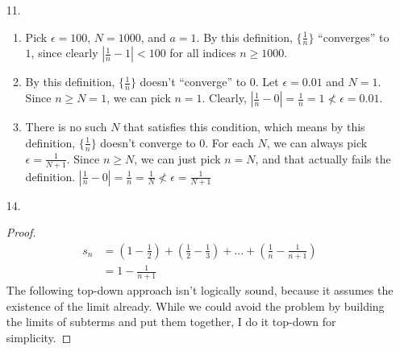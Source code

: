 \documentclass{article}
\begin{document}
\begin{itemize}
\begin{proof}
    The ``only if'' part is very similar. Suppose $\epsilon>0$, then
    we have $|c_n-c|<\epsilon$ when $n \geq N$ for some $N$. We want
    to show that $|(c_n-c)-0| < \epsilon$, and this is clearly true
    since $|(c_n-c)-0|=|c_n-c|<\epsilon$, with the $N$ we just found.
  \end{proof}
\item [11.]
  \begin{enumerate}[label=\alph*.]
  \item Pick $\epsilon=100$, $N=1000$, and $a=1$. By this definition,
    $\{\frac{1}{n}\}$ ``converges'' to $1$, since clearly
    $|\frac{1}{n}-1| < 100$ for all indices $n \geq 1000$.
  \item By this definition, $\{\frac{1}{n}\}$ doesn't ``converge'' to
    $0$. Let $\epsilon = 0.01$ and $N=1$. Since $n \geq N = 1$, we can
    pick $n=1$. Clearly, $|\frac{1}{n} - 0| = \frac{1}{n} = 1 \nless
    \epsilon = 0.01$. 
  \item There is no such $N$ that satisfies this condition, which
    means by this definition, $\{\frac{1}{n}\}$ doesn't converge to
    $0$. For each $N$, we can always pick $\epsilon =
    \frac{1}{N+1}$. Since $n\geq N$, we can just pick $n=N$, and that
    actually fails the definition. $|\frac{1}{n}-0| = \frac{1}{n} =
    \frac{1}{N} \nless \epsilon = \frac{1}{N+1}$
  \end{enumerate}
\item [14.]
  \begin{proof}
    \begin{equation*}
      \begin{split}
        s_n &= (1-\frac{1}{2}) + (\frac{1}{2} - \frac{1}{3}) + ... +
        (\frac{1}{n}-\frac{1}{n+1})\\
        &= 1 - \frac{1}{n+1}
      \end{split}
    \end{equation*}
    The following top-down approach isn't logically sound, because it
    assumes the existence of the limit already. While we could avoid the
    problem by building the limits of subterms and put them together,
    I do it top-down for simplicity.


\end{proof}
\end{itemize}
\end{document}
